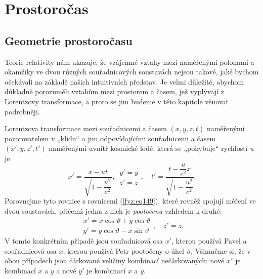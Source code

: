 \setchaptertoc
\chapter{Prostoročas}\label{fyz:IchapXVII}

  \section{Geometrie prostoročasu}\label{fyz:IchapXVIIsecI}
    Teorie relativity nám ukazuje, že vzájemné vztahy mezi naměřenými polohami a okamžiky ve dvou 
    různých souřadnicových soustavách nejsou takové, jaké bychom očekávali na základě našich 
    intuitivních představ. Je velmi důležité, abychom důkladně porozuměli vztahům mezi prostorem a 
    časem, jež vyplývají z Lorentzovy transformace, a proto se jim budeme v této kapitole věnovat 
    podrobněji.
    
    Lorentzova transformace mezi souřadnicemi a časem \((x, y, z, t)\) naměřenými pozorovatelem v
    „klidu“ a jim odpovídajícími souřadnicemi a časem \((x', y, z', t')\) naměřenými uvnitř kosmické
    lodě, která se „pohybuje“ rychlostí \(u\) je
    \begin{equation}\label{fyz:eq220}
      x' = \frac{x - ut}{\sqrt{1-\dfrac{u^2}{c^2}}}, \,
      \begin{array}{c}
        y' = y \\ 
        z' = z
      \end{array}\!,                         \quad
      t' = \frac{t-\dfrac{u}{c^2}x}{\sqrt{1-\dfrac{u^2}{c^2}}}. 
    \end{equation} 
    Porovnejme tyto rovnice s rovnicemi (\ref{fyz:eq149}), které rovněž spojují měření ve dvou 
    soustavách, přičemž jedna z nich je \emph{pootočena} vzhledem k druhé:
    \begin{equation}\label{fyz:eq221}
      \begin{array}{c}
        x' = x\cos\vartheta + y\cos\vartheta \\
        y' = y\cos\vartheta - x\sin\vartheta 
      \end{array},\quad
        z' = z.
    \end{equation}
    V tomto konkrétním případě jsou souřadnicová osa \(x'\), kterou používá Pavel a souřadnicová 
    osa \(x\), kterou používá Petr pootočeny o úhel \(\vartheta\). Všimněme si, že v obou případech 
    jsou čárkované veličiny kombinací nečárkovaných: nové \(x'\) je kombinací \(x\) a \(y\) a nové 
    \(y'\) je kombinací \(x\) a \(y\).
    
